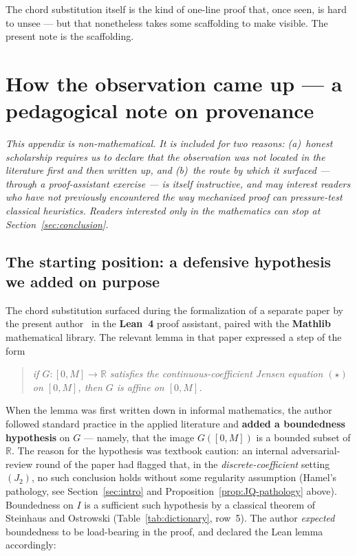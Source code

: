 \documentclass[review,12pt,a4paper]{elsarticle}
\theoremstyle{remark}
\begin{document}
The chord substitution itself is the kind of one-line proof that, once
seen, is hard to unsee --- but that nonetheless takes some scaffolding to
make visible. The present note is the scaffolding.

\appendix

\section{How the observation came up --- a pedagogical note on provenance}
\label{sec:provenance}

\emph{This appendix is non-mathematical. It is included for two reasons:
(a)~honest scholarship requires us to declare that the observation was
not located in the literature first and then written up, and (b)~the
route by which it surfaced --- through a proof-assistant exercise ---
is itself instructive, and may interest readers who have not previously
encountered the way mechanized proof can pressure-test classical
heuristics. Readers interested only in the mathematics can stop at
Section~\ref{sec:conclusion}.}

\subsection{The starting position: a defensive hypothesis we added on purpose}

The chord substitution surfaced during the formalization of a separate
paper by the present author~\cite{El2} in the \textbf{Lean~4} proof
assistant, paired with the \textbf{Mathlib} mathematical library. The
relevant lemma in that paper expressed a step of the form

\begin{quote}
\emph{if $G : [0, M] \to \mathbb{R}$ satisfies the continuous-coefficient
Jensen equation $(\star)$ on $[0, M]$, then $G$ is affine on $[0, M]$.}
\end{quote}

When the lemma was first written down in informal mathematics, the
author followed standard practice in the applied literature and
\textbf{added a boundedness hypothesis} on $G$ --- namely, that the image
$G([0, M])$ is a bounded subset of $\mathbb{R}$. The reason for the
hypothesis was textbook caution: an internal adversarial-review round of
the paper had flagged that, in the \emph{discrete-coefficient} setting
$(J_2)$, no such conclusion holds without some regularity assumption
(Hamel's pathology, see Section~\ref{sec:intro} and
Proposition~\ref{prop:JQ-pathology} above). Boundedness on $I$ is a sufficient
such hypothesis by a classical theorem of Steinhaus and Ostrowski
(Table~\ref{tab:dictionary}, row~5). The author \emph{expected} boundedness
to be load-bearing in the proof, and declared the Lean lemma accordingly:
\end{document}
